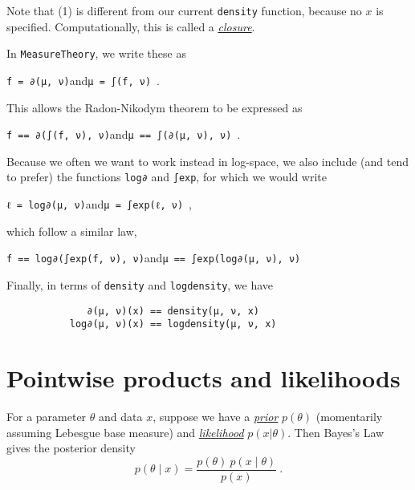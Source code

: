 \documentclass{juliacon}
\newcommand{\chad}[2][] {\todo[inline,backgroundcolor=orange!20!white, size=\footnotesize,#1]{(Chad) #2 }}
\newcommand{\moritz}[2][] {\todo[inline,backgroundcolor=blue!10!white, size=\footnotesize,#1]{(Moritz) #2 }}
\begin{document}
Note that (1) is different from our current \verb|density| function, because no $x$ is specified. Computationally, this is called a \href{https://en.wikipedia.org/wiki/Closure_(computer_programming)}{\emph{closure}}.

In \verb|MeasureTheory|, we write these as 

\begin{center}
    \verb|f = ∂(μ, ν)|\quad and\quad \verb|μ = ∫(f, ν)|\ .
\end{center}

This allows the Radon-Nikodym theorem to be expressed as
\begin{center}
    \verb|f == ∂(∫(f, ν), ν)|\quad and\quad \verb|μ == ∫(∂(μ, ν), ν)|\ .
\end{center}

Because we often we want to work instead in log-space, we also include (and tend to prefer) the functions \verb|log∂| and \verb|∫exp|, for which we would write
\begin{center}
    \verb|ℓ = log∂(μ, ν)|\quad and\quad \verb|μ = ∫exp(ℓ, ν)|\ ,
\end{center}
which follow a similar law,
\begin{center}
\verb|f == log∂(∫exp(f, ν), ν)|\quad and\quad \verb|μ == ∫exp(log∂(μ, ν), ν)|
\end{center}

Finally, in terms of \verb|density| and \verb|logdensity|, we have
\begin{verbatim}
              ∂(μ, ν)(x) == density(μ, ν, x)
           log∂(μ, ν)(x) == logdensity(μ, ν, x)
\end{verbatim}




\section{Pointwise products and likelihoods \label{Likelihoods}}

For a parameter $\theta$ and data $x$, suppose we have a \href{https://en.wikipedia.org/wiki/Prior_probability}{\emph{prior}} $p(\theta)$ (momentarily assuming Lebesgue base measure) and \href{https://en.wikipedia.org/wiki/Likelihood_function}{\emph{likelihood}} $p(x | \theta)$. Then Bayes's Law gives the posterior density
\[
p(\theta \mid x) = \frac{p(\theta)\ p(x \mid \theta)}{p(x)}\ .
\]
\end{document}
